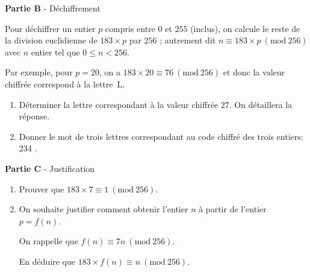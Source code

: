 \documentclass[10pt]{article}
\begin{document}
\bigskip

\textbf{Partie B }- Déchiffrement

\medskip

Pour déchiffrer un entier $p$ compris entre $0$ et $255$ (inclus), on calcule le reste de la division euclidienne de $183 \times p$ par $256$ ; autrement dit $n \equiv 183 \times p \:(\text{mod}~256)$ avec $n$ entier tel que $0 \leqslant  n < 256$.

\smallskip

Par exemple, pour $p = 20$, on a $183 \times 20  \equiv 76 \:(\text{mod}~256)$ et donc la valeur chiffrée correspond à la lettre~L.

\medskip

\begin{enumerate}
\item Déterminer la lettre correspondant à la valeur chiffrée $27$. On détaillera la réponse.
\item  Donner le mot de trois lettres correspondant au code chiffré des trois entiers:
234 .
\end{enumerate}

\bigskip

\textbf{Partie C} - Justification

\medskip

\begin{enumerate}
\item Prouver que $183 \times 7 \equiv 1\:(\text{mod}~256)$.
\item On souhaite justifier comment obtenir l'entier $n$ à partir de l'entier $p = f(n)$.

On rappelle que $f(n) \equiv 7n \: (\text{mod}~256)$.

En déduire que $183 \times f(n) \equiv n \: (\text{mod}~256)$.
\end{enumerate}
\end{document}
